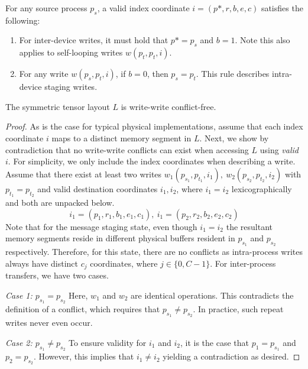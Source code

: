 \begin{definition}
    For any source process $p_s$, a valid index coordinate $i = (p*, r, b, e, c)$ satisfies the following:
    \begin{enumerate}
        \item For inter-device writes, it must hold that $p* = p_s$ and $b = 1$.
        Note this also applies to self-looping writes $w(p_t, p_t, i)$.
        \item For any write $w(p_s, p_t, i)$, if $b = 0$, then $p_s = p_t$.
        This rule describes intra-device staging writes.
    \end{enumerate}
\end{definition}
\begin{theorem}\label{theorem:ww}
The symmetric tensor layout $L$ is write-write conflict-free.
\end{theorem}
\begin{proof}
    As is the case for typical physical implementations,
    assume that each index coordinate $i$ maps to a distinct memory segment in $L$.
    Next, we show by contradiction that no write-write conflicts can exist when accessing $L$ using \emph{valid} $i$.
    For simplicity, we only include the index coordinates when describing a write.
    Assume that there exist at least two writes $w_1(p_{s_1}, p_{t_1}, i_1),\>w_2(p_{s_2}, p_{t_2}, i_2)$
    with $p_{t_1} = p_{t_2}$ and valid destination coordinates
    $i_1, i_2$, where $i_1 = i_2$ lexicographically and both are unpacked below.
    \[
        i_1 = (p_1, r_1, b_1, e_1, c_1),\> i_1 = (p_2, r_2, b_2, e_2, c_2)
    \]
    Note that for the message staging state, even though $i_1 = i_2$ the resultant memory segments reside in
    different physical buffers resident in $p_{s_1}$ and $p_{s_2}$ respectively.
    Therefore, for this state, there are no conflicts as intra-process writes always have distinct $c_j$
    coordinates, where $j \in \{0, C - 1\}$.
    For inter-process transfers, we have two cases.

    \textit{Case 1: $p_{s_1} = p_{s_2}$}
    \newline Here, $w_1$ and $w_2$ are identical operations.
    This contradicts the definition of a conflict, which requires that $p_{s_1} \neq p_{s_2}$.
    In practice, such repeat writes never even occur.

    \textit{Case 2: $p_{s_1} \neq p_{s_2}$}
    \newline To ensure validity for $i_1$ and $i_2$, it is the case that $p_1 = p_{s_1}$ and $p_2 = p_{s_2}$.
    However, this implies that $i_1 \neq i_2$ yielding a contradiction as desired.
\end{proof}
